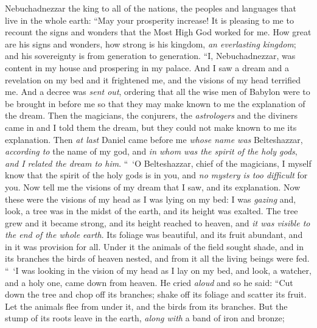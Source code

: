 \begin{biblechapter} %
  Nebuchadnezzar the king to all of the nations, the peoples and languages that live in the whole earth: “May your prosperity increase!
\verse It is pleasing to me to recount the signs and wonders that the Most High God worked for me.
\verse How great are his signs and wonders, how strong is his kingdom, \textit{an everlasting kingdom}; and his sovereignty is from generation to generation.
 “I, Nebuchadnezzar, was content in my house and prospering in my palace.
\verse And I saw a dream and a revelation on my bed and it frightened me, and the visions of my head terrified me.
\verse And a decree was \textit{sent out}, ordering that all the wise men of Babylon were to be brought in before me so that they may make known to me the explanation of the dream.
\verse Then the magicians, the conjurers, the \textit{astrologers} and the diviners came in and I told them the dream, but they could not make known to me its explanation.
\verse Then \textit{at last} Daniel came before me \textit{whose name was} Belteshazzar, \textit{according to} the name of my god, and \textit{in whom was the spirit of the holy gods}, \textit{and I related the dream to him}.
\verse “ ‘O Belteshazzar, chief of the magicians, I myself know that the spirit of the holy gods is in you, and \textit{no mystery is too difficult} for you. Now tell me the visions of my dream that I saw, and its explanation.
\verse Now these were the visions of my head as I was lying on my bed: I was \textit{gazing} and, look, a tree was in the midst of the earth, and its height was exalted.
\verse The tree grew and it became strong, 
and its height reached to heaven, 
and \textit{it was visible to the end of the whole earth}.
\verse Its foliage was beautiful, 
and its fruit abundant, 
and in it was provision for all. 
Under it the animals of the field sought shade, 
and in its branches the birds of heaven nested, 
and from it all the living beings were fed.
\verse “ ‘I was looking in the vision of my head as I lay on my bed, and look, a watcher, and a holy one, came down from heaven.
\verse He cried \textit{aloud} and so he said:
\verse “Cut down the tree and chop off its branches; 
shake off its foliage and scatter its fruit. 
Let the animals flee from under it, 
and the birds from its branches.
\verse But the stump of its roots 
leave in the earth, 
\textit{along with} a band of iron and bronze; 

\end{biblechapter}
